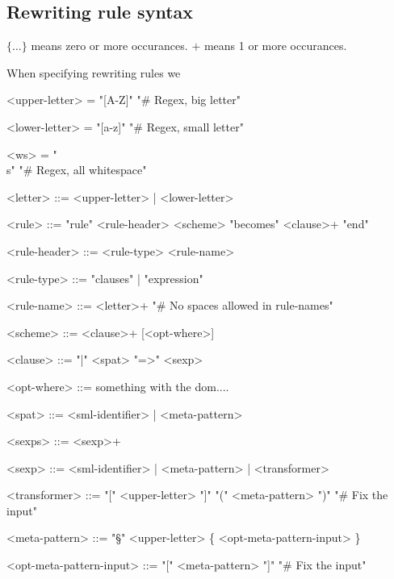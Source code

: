\subsection{Rewriting rule syntax}

$\{ \ldots \}$ means zero or more occurances.
$+$ means 1 or more occurances.

When specifying rewriting rules we 


\setlength{\grammarindent}{7.3em}
\begin{grammar} 
 
  <upper-letter> = "[A-Z]" \hfill "# Regex, big letter"

  <lower-letter> = "[a-z]" \hfill "# Regex, small letter"

  <ws> = "\\s" \hfill "\# Regex, all whitespace"

  <letter> ::= <upper-letter> | <lower-letter>


  <rule> ::= "rule" <rule-header> <scheme> "becomes" <clause>+
  "end"

  <rule-header> ::= <rule-type> <rule-name>

  <rule-type> ::= "clauses" | "expression" 

  <rule-name> ::= <letter>+ \hfill "\# No spaces allowed in rule-names"

  <scheme> ::= <clause>+ [<opt-where>]


  <clause> ::= "|" <spat> "=>" <sexp>

  <opt-where> ::= something with the dom....

  <spat> ::= <sml-identifier> | <meta-pattern>

  <sexps>  ::= <sexp>+
  
  <sexp>   ::= <sml-identifier> | <meta-pattern> | <transformer>

  <transformer> ::= "[" <upper-letter> "]" "(" <meta-pattern> ")" \hfill "\# Fix the input"

  <meta-pattern> ::= "§" <upper-letter> \{ <opt-meta-pattern-input> \}

  <opt-meta-pattern-input> ::= "[" <meta-pattern> "]" \hfill "\# Fix the input"

\end{grammar}

